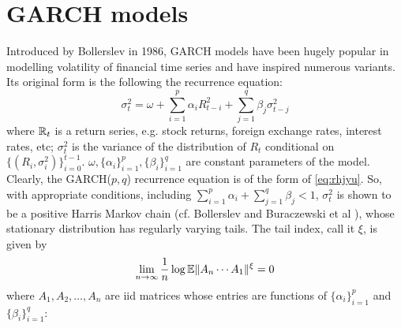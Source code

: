 
\section{GARCH models}
Introduced by Bollerslev in 1986, GARCH models have been hugely
popular in modelling volatility of financial time series and have
inspired numerous variants. Its original form is the following the
recurrence equation:
\[
\sigma_t^2 = \omega + \sum_{i=1}^p \alpha_i R_{t-i}^2 +
\sum_{j=1}^q \beta_j \sigma_{t-j}^2
\]
where $\mathbb{R}_t$ is a return series, e.g. stock returns, foreign exchange
rates, interest rates, etc; $\sigma_t^2$ is the variance of the
distribution of $R_t$ conditional on $\{(R_i,
\sigma_i^2)\}_{i=0}^{t-1}$. $\omega, \{\alpha_i\}_{i=1}^p,
\{\beta_i\}_{i=1}^q$ are constant parameters of the model. Clearly,
the GARCH($p,q$) recurrence equation is of the form of
\eqref{eq:rhjyu}. So, with appropriate conditions, including
$\sum_{i=1}^p \alpha_i + \sum_{j=1}^q \beta_j < 1$, $\sigma_t^2$ is
shown to be a positive Harris Markov chain (cf. Bollerslev
\cite{bollerslev:1986} and Buraczewski et al
\cite{buraczewski:damek:mikosch:2016}), whose stationary distribution
has regularly varying tails. The tail index, call it $\xi$, is given by
\[
\lim_{n \to \infty} {1 \over n}\log\mathbb{E}\|A_n \cdots A_1\|^\xi = 0
\]
where $A_1, A_2, \dots, A_n$ are iid matrices whose entries are
functions of $\{\alpha_i\}_{i=1}^p$ and $\{\beta_i\}_{i=1}^q$:
